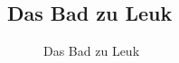\documentclass[
  letterpaper,
  DIV=11,
  numbers=noendperiod]{scrartcl}
\begin{document}
\subsection{Das Bad zu Leuk}\label{das-bad-zu-leuk}

\begin{figure}


\caption{\label{fig-bad-zu-leuk}Das Bad zu Leuk}

\end{figure}%
\end{document}
